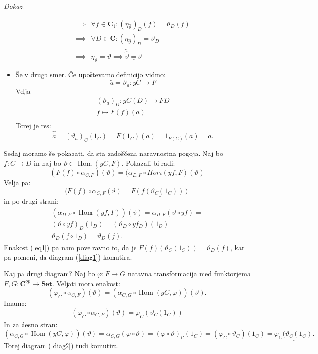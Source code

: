 \documentclass[12pt,a4paper]{book}
\theoremstyle{definition}
\theoremstyle{plain}
\newenvironment{dokaz}{\emph{Dokaz.}\ }{\hspace{\fill}{$\Box$}}
\theoremstyle{definition}
\theoremstyle{remark}
\newcommand{\cat}[1]{\textbf{#1}}
\DeclareMathOperator{\Hom}{Hom}
\begin{document}
\begin{dokaz}
\begin{itemize}
\begin{align*}
\implies& \forall f \in \textbf{C}_1  : (\eta_{\widehat{\vartheta}})_D(f) = \vartheta_D(f) \\
\implies& \forall D \in \textbf{C} : (\eta_{\widehat{\vartheta}})_D = \vartheta_D \\
\implies& \eta_{\widehat{\vartheta}} = \vartheta
\implies \underline{\widetilde{\widehat{\vartheta}} = \vartheta}
\end{align*}
\item Še v drugo smer. Če upoštevamo definicijo vidmo:
$$\widetilde{a} = \vartheta_a : yC \to F$$
Velja
\begin{align*}
(\vartheta_a)_D : yC(D) \to FD \\
f \mapsto F(f)(a) \\
\end{align*}
Torej je res:
$$\widehat{\widetilde{a}} = (\vartheta_a)_C(1_C) = F(1_C)(a) = 1_{F(C)}(a) = a.$$
\end{itemize}
%
Sedaj moramo še pokazati, da sta zadoščena naravnostna pogoja.
Naj bo $f : C \to D$ in naj bo $\vartheta \in \Hom(yC,F)$.
Pokazali bi radi:
\begin{equation}
(F(f) \circ \alpha_{C,F})(\vartheta) = (\alpha_{D,F} \circ Hom(yf,F)(\vartheta)
\end{equation}
Velja pa:
$$(F(f) \circ \alpha_{C,F}(\vartheta) = \underline{F(f(\vartheta_C(1_C)))}$$
in po drugi strani:
\begin{align*}
(\alpha_{D,F} \circ \Hom(yf,F))(\vartheta) = \alpha_{D,F}(\vartheta \circ yf) = \\
(\vartheta \circ yf)_D (1_D) = (\vartheta_D \circ yf_D)(1_D) = \\
\vartheta_D(f \circ 1_D) = \underline{\vartheta_D(f)}.
\end{align*}
Enakost (\ref{eq1}) pa nam pove ravno to, da je $F(f)(\vartheta_C(1_C)) = \vartheta_D(f)$, kar pa pomeni, da diagram (\ref{diag1}) komutira.

Kaj pa drugi diagram? Naj bo $\varphi : F \to G$ naravna transformacija med funktorjema $F,G : \cat{C}^{op} \to \cat{Set}$.
Veljati mora enakost:
$$(\varphi_C \circ \alpha_{C,F})(\vartheta) = (\alpha_{C,G} \circ \Hom(yC,\varphi))(\vartheta).$$
Imamo:
$$(\varphi_C \circ \alpha_{C,F})(\vartheta) = \underline{\varphi_C(\vartheta_C(1_C))}$$
In za desno stran:
$$(\alpha_{C,G} \circ \Hom(yC,\varphi))(\vartheta) = \alpha_{C,G}(\varphi \circ \vartheta) = 
(\varphi \circ \vartheta)_C(1_C) = (\varphi_C \circ \vartheta_C)(1_C) = \underline{\varphi_C(\vartheta_C(1_C)}.$$
Torej diagram (\ref{diag2}) tudi komutira.

\end{dokaz}
\end{document}
